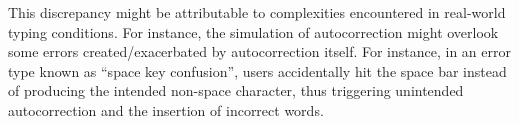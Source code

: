 This discrepancy might be attributable to complexities encountered in real-world typing conditions.
For instance, the simulation of autocorrection might overlook some errors created/exacerbated by autocorrection itself. For instance, in an error type known as ``space key confusion'', users accidentally hit the space bar instead of producing the intended non-space character, thus triggering unintended autocorrection and the insertion of incorrect words.
 






